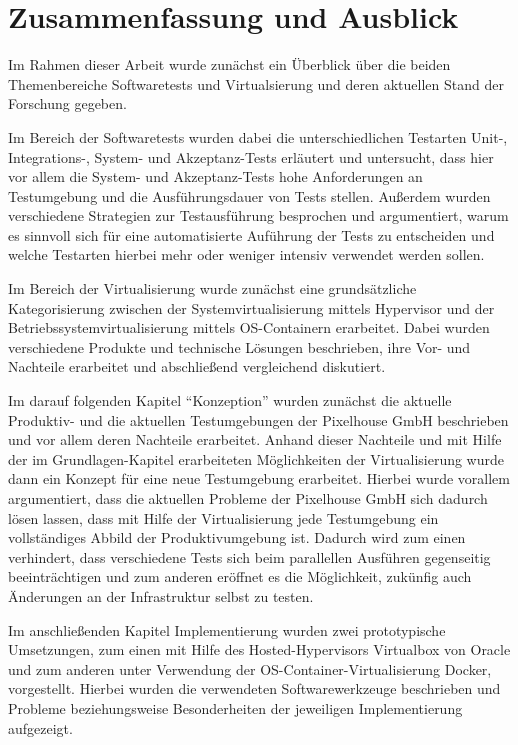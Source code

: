 \section{Zusammenfassung und Ausblick}

Im Rahmen dieser Arbeit wurde zunächst ein Überblick über die beiden Themenbereiche Softwaretests und Virtualsierung und deren aktuellen Stand der Forschung gegeben.

Im Bereich der Softwaretests wurden dabei die unterschiedlichen Testarten Unit-, Integrations-, System- und Akzeptanz-Tests erläutert und untersucht, dass hier vor allem die System- und Akzeptanz-Tests hohe Anforderungen an Testumgebung und die Ausführungsdauer von Tests stellen. Außerdem wurden verschiedene Strategien zur Testausführung besprochen und argumentiert, warum es sinnvoll sich für eine automatisierte Auführung der Tests zu entscheiden und welche Testarten hierbei mehr oder weniger intensiv verwendet werden sollen.

Im Bereich der Virtualisierung wurde zunächst eine grundsätzliche Kategorisierung zwischen der Systemvirtualisierung mittels Hypervisor und der Betriebssystemvirtualisierung mittels OS-Containern
erarbeitet. Dabei wurden verschiedene Produkte und technische Lösungen beschrieben, ihre Vor- und Nachteile erarbeitet und abschließend vergleichend diskutiert.

Im darauf folgenden Kapitel "`Konzeption"' wurden zunächst die aktuelle Produktiv- und die aktuellen Testumgebungen der Pixelhouse GmbH beschrieben und vor allem deren Nachteile erarbeitet. Anhand dieser Nachteile und mit Hilfe der im Grundlagen-Kapitel erarbeiteten Möglichkeiten der Virtualisierung wurde dann ein Konzept für eine neue Testumgebung erarbeitet. Hierbei wurde vorallem argumentiert, dass die aktuellen Probleme der Pixelhouse GmbH sich dadurch lösen lassen, dass mit Hilfe der Virtualisierung jede Testumgebung ein vollständiges Abbild der Produktivumgebung ist. Dadurch wird zum einen verhindert, dass verschiedene Tests sich beim parallellen Ausführen gegenseitig beeinträchtigen und zum anderen eröffnet es die Möglichkeit, zukünfig auch Änderungen an der Infrastruktur selbst zu testen.

Im anschließenden Kapitel Implementierung wurden zwei prototypische Umsetzungen, zum einen mit Hilfe des Hosted-Hypervisors Virtualbox von Oracle und zum anderen unter Verwendung der OS-Container-Virtualisierung Docker, vorgestellt. Hierbei wurden die verwendeten Softwarewerkzeuge beschrieben und Probleme beziehungsweise Besonderheiten der jeweiligen Implementierung aufgezeigt.

